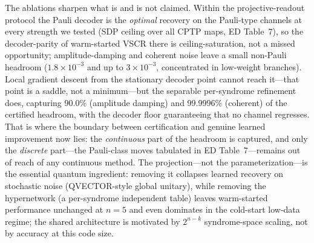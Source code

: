 \documentclass[aps,prxquantum,reprint,superscriptaddress]{revtex4-2}
\begin{document}
The ablations sharpen what is and is not claimed. Within the
projective-readout protocol the Pauli decoder is the \emph{optimal} recovery
on the Pauli-type channels at every strength we tested (SDP ceiling over all
CPTP maps, ED Table~7), so the decoder-parity of warm-started VSCR there is
ceiling-saturation, not a missed opportunity; amplitude-damping and coherent
noise leave a small non-Pauli headroom ($1.8\times10^{-3}$ and up to
$3\times10^{-3}$, concentrated in low-weight branches). Local gradient descent
from the stationary decoder point cannot reach it---that point is a saddle, not a
minimum---but the separable per-syndrome refinement does, capturing $90.0\%$
(amplitude damping) and $99.9996\%$ (coherent) of the certified headroom, with
the decoder floor guaranteeing that no channel regresses. That is where the
boundary between certification and genuine learned improvement now lies: the
\emph{continuous} part of the headroom is captured, and only the \emph{discrete}
part---the Pauli-class moves tabulated in ED Table~7---remains out of reach of
any continuous method.
The projection---not the parameterization---is the essential quantum
ingredient: removing it collapses learned recovery on stochastic noise
(QVECTOR-style global unitary), while removing the hypernetwork (a
per-syndrome independent table) leaves warm-started performance unchanged at
$n=5$ and even dominates in the cold-start low-data regime; the shared
architecture is motivated by $2^{n-k}$ syndrome-space scaling, not by
accuracy at this code size.
\end{document}
